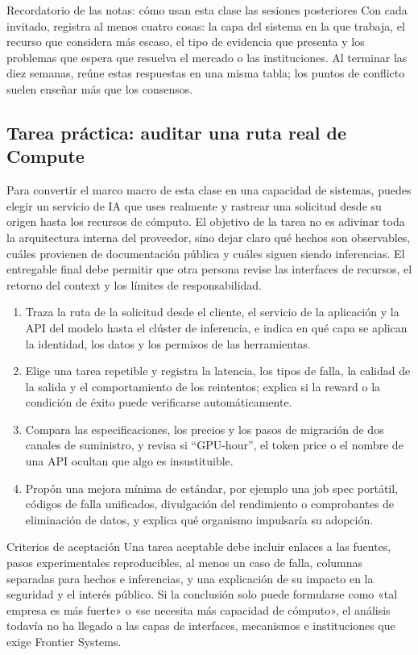 \begin{knowledgebox}{Recordatorio de las notas: cómo usan esta clase las sesiones posteriores}
Con cada invitado, registra al menos cuatro cosas: la capa del sistema en la que trabaja, el recurso que considera más escaso, el tipo de evidencia que presenta y los problemas que espera que resuelva el mercado o las instituciones. Al terminar las diez semanas, reúne estas respuestas en una misma tabla; los puntos de conflicto suelen enseñar más que los consensos.
\end{knowledgebox}

\subsection{Tarea práctica: auditar una ruta real de Compute}

Para convertir el marco macro de esta clase en una capacidad de sistemas, puedes elegir un servicio de IA que uses realmente y rastrear una solicitud desde su origen hasta los recursos de cómputo. El objetivo de la tarea no es adivinar toda la arquitectura interna del proveedor, sino dejar claro qué hechos son observables, cuáles provienen de documentación pública y cuáles siguen siendo inferencias. El entregable final debe permitir que otra persona revise las interfaces de recursos, el retorno del context y los límites de responsabilidad.

\begin{enumerate}
  \item Traza la ruta de la solicitud desde el cliente, el servicio de la aplicación y la API del modelo hasta el clúster de inferencia, e indica en qué capa se aplican la identidad, los datos y los permisos de las herramientas.
  \item Elige una tarea repetible y registra la latencia, los tipos de falla, la calidad de la salida y el comportamiento de los reintentos; explica si la reward o la condición de éxito puede verificarse automáticamente.
  \item Compara las especificaciones, los precios y los pasos de migración de dos canales de suministro, y revisa si ``GPU-hour'', el token price o el nombre de una API ocultan que algo es insustituible.
  \item Propón una mejora mínima de estándar, por ejemplo una job spec portátil, códigos de falla unificados, divulgación del rendimiento o comprobantes de eliminación de datos, y explica qué organismo impulsaría su adopción.
\end{enumerate}

\begin{importantbox}{Criterios de aceptación}
Una tarea aceptable debe incluir enlaces a las fuentes, pasos experimentales reproducibles, al menos un caso de falla, columnas separadas para hechos e inferencias, y una explicación de su impacto en la seguridad y el interés público. Si la conclusión solo puede formularse como «tal empresa es más fuerte» o «se necesita más capacidad de cómputo», el análisis todavía no ha llegado a las capas de interfaces, mecanismos e instituciones que exige Frontier Systems.
\end{importantbox}



